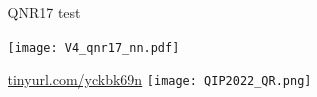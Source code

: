 \documentclass[final]{beamer}
\newlength{\sepwidth}
\newlength{\colwidth}
\newlength{\circwidth}
\newcommand{\separatorcolumn}{\begin{column}{\sepwidth}\end{column}}
\begin{document}
\begin{frame}[t]
\begin{columns}[t]
\begin{column}{\colwidth}
\end{column}

\separatorcolumn

\begin{column}{\circwidth}
  \begin{block}{QNR17 test}
    \begin{center}
    \texttt{[image: V4\_qnr17\_nn.pdf]}
    \vspace{10mm}
    \noindent

    \url{tinyurl.com/yckbk69n}
  \texttt{[image: QIP2022\_QR.png]}
  \end{center}

  \end{block}
  
\end{column}

\separatorcolumn
\end{columns}
\end{frame}
\end{document}

